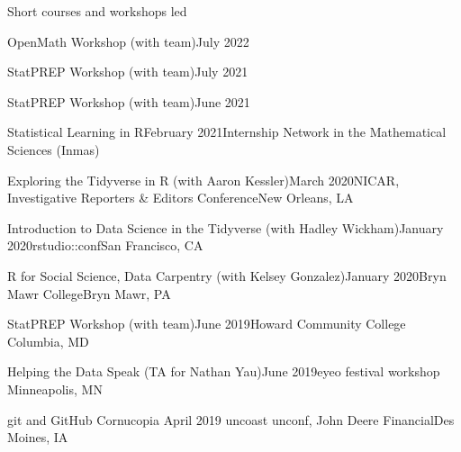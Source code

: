 \documentclass{resume} %
\begin{document}

\begin{rSection}{Short courses and workshops led}

\begin{sSubsection}{OpenMath Workshop}{ (with team)}{July 2022}{}{ }
\end{sSubsection}

\begin{sSubsection}{StatPREP Workshop}{ (with team)}{July 2021}{}{ }
\end{sSubsection}

\begin{sSubsection}{StatPREP Workshop}{ (with team)}{June 2021}{}{ }
\end{sSubsection}

\begin{sSubsection}{Statistical Learning in R}{}{February 2021}{Internship Network in the Mathematical Sciences (Inmas)}{}
\end{sSubsection}

\begin{sSubsection}{Exploring the Tidyverse in R}{ (with Aaron Kessler)}{March 2020}{NICAR, Investigative Reporters \& Editors Conference}{New Orleans, LA}
\end{sSubsection}

\begin{sSubsection}{Introduction to Data Science in the Tidyverse}{ (with Hadley Wickham)}{January 2020}{rstudio::conf}{San Francisco, CA}
\end{sSubsection}

\begin{sSubsection}{R for Social Science, Data Carpentry}{ (with Kelsey Gonzalez)}{January 2020}{Bryn Mawr College}{Bryn Mawr, PA}
\end{sSubsection}

\begin{sSubsection}{StatPREP Workshop}{ (with team)}{June 2019}{Howard Community College }{Columbia, MD}
\end{sSubsection}

\begin{sSubsection}{Helping the Data Speak}{ (TA for Nathan Yau)}{June 2019}{eyeo festival workshop }{Minneapolis, MN}
\end{sSubsection}

\begin{sSubsection}{git and GitHub Cornucopia}{ }{April 2019}{ uncoast unconf, John Deere Financial}{Des Moines, IA}
\end{sSubsection}


\end{rSection}
\end{document}
